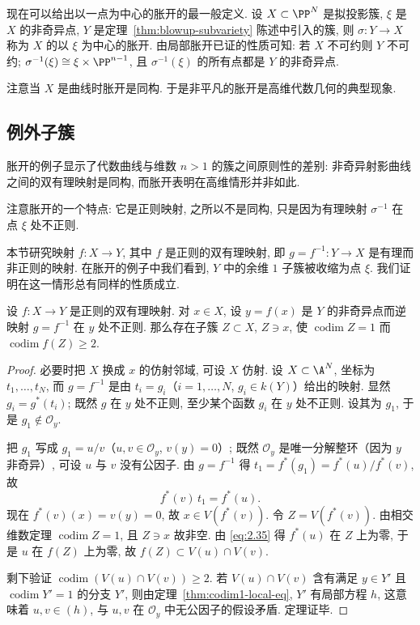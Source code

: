 现在可以给出以一点为中心的胀开的最一般定义. 设 $X \subset \PP^N$ 是拟投影簇, $\xi$ 是 $X$ 的非奇异点, $Y$ 是定理~\ref{thm:blowup-subvariety} 陈述中引入的簇, 则 $\sigma: Y \to X$ 称为 $X$ 的以 $\xi$ 为中心的胀开. 由局部胀开已证的性质可知: 若 $X$ 不可约则 $Y$ 不可约; $\sigma^{-1}(\xi) \cong \xi \times \PP^{n-1}$, 且 $\sigma^{-1}(\xi)$ 的所有点都是 $Y$ 的非奇异点.

注意当 $X$ 是曲线时胀开是同构. 于是非平凡的胀开是高维代数几何的典型现象.

\subsection{例外子簇}

胀开的例子显示了代数曲线与维数 $n > 1$ 的簇之间原则性的差别: 非奇异射影曲线之间的双有理映射是同构, 而胀开表明在高维情形并非如此.

注意胀开的一个特点: 它是正则映射, 之所以不是同构, 只是因为有理映射 $\sigma^{-1}$ 在点 $\xi$ 处不正则.

本节研究映射 $f: X \to Y$, 其中 $f$ 是正则的双有理映射, 即 $g = f^{-1}: Y \to X$ 是有理而非正则的映射. 在胀开的例子中我们看到, $Y$ 中的余维 $1$ 子簇被收缩为点 $\xi$. 我们证明在这一情形总有同样的性质成立.

\begin{theorem}\label{thm:exceptional}
	设 $f: X \to Y$ 是正则的双有理映射. 对 $x \in X$, 设 $y = f(x)$ 是 $Y$ 的非奇异点而逆映射 $g = f^{-1}$ 在 $y$ 处不正则. 那么存在子簇 $Z \subset X$, $Z \ni x$, 使 $\operatorname{codim} Z = 1$ 而 $\operatorname{codim} f(Z) \ge 2$.
\end{theorem}

\begin{proof}
	必要时把 $X$ 换成 $x$ 的仿射邻域, 可设 $X$ 仿射. 设 $X \subset \A^N$, 坐标为 $t_1, \ldots, t_N$, 而 $g = f^{-1}$ 是由 $t_i = g_i$（$i = 1, \ldots, N$, $g_i \in k(Y)$）给出的映射. 显然 $g_i = g^*(t_i)$; 既然 $g$ 在 $y$ 处不正则, 至少某个函数 $g_i$ 在 $y$ 处不正则. 设其为 $g_1$, 于是 $g_1 \notin \mathcal O_y$.

	把 $g_1$ 写成 $g_1 = u/v$（$u, v \in \mathcal O_y$, $v(y) = 0$）; 既然 $\mathcal O_y$ 是唯一分解整环（因为 $y$ 非奇异）, 可设 $u$ 与 $v$ 没有公因子. 由 $g = f^{-1}$ 得 $t_1 = f^*(g_1) = f^*(u)/f^*(v)$, 故
	\begin{equation}
		\label{eq:2.35}
		f^*(v)\, t_1 = f^*(u).
	\end{equation}
	现在 $f^*(v)(x) = v(y) = 0$, 故 $x \in V(f^*(v))$. 令 $Z = V(f^*(v))$. 由相交维数定理 $\operatorname{codim} Z = 1$, 且 $Z \ni x$ 故非空. 由 \eqref{eq:2.35} 得 $f^*(u)$ 在 $Z$ 上为零, 于是 $u$ 在 $f(Z)$ 上为零, 故 $f(Z) \subset V(u) \cap V(v)$.

	剩下验证 $\operatorname{codim}(V(u) \cap V(v)) \ge 2$. 若 $V(u) \cap V(v)$ 含有满足 $y \in Y'$ 且 $\operatorname{codim} Y' = 1$ 的分支 $Y'$, 则由定理~\ref{thm:codim1-local-eq}, $Y'$ 有局部方程 $h$, 这意味着 $u, v \in (h)$, 与 $u, v$ 在 $\mathcal O_y$ 中无公因子的假设矛盾. 定理证毕.
\end{proof}


